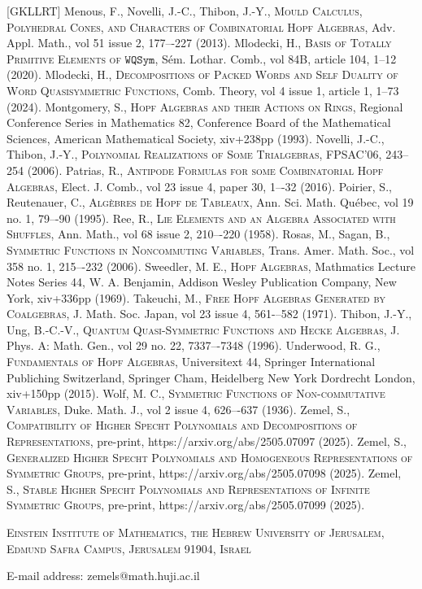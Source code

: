 \documentclass{article}
\theoremstyle{definition}
\begin{document}
\begin{thebibliography}{[GKLLRT]}
\bibitem[MNT]{[MNT]} Menous, F., Novelli, J.-C., Thibon, J.-Y., \textsc{Mould Calculus, Polyhedral Cones, and Characters of Combinatorial Hopf Algebras}, Adv. Appl. Math., vol 51 issue 2, 177–-227 (2013).
\bibitem[Ml1]{[Ml1]} Mlodecki, H., \textsc{Basis of Totally Primitive Elements of $\mathtt{WQSym}$}, S\'{e}m. Lothar. Comb., vol 84B, article 104, 1--12 (2020).
\bibitem[Ml2]{[Ml2]} Mlodecki, H., \textsc{Decompositions of Packed Words and Self Duality of Word Quasisymmetric Functions}, Comb. Theory, vol 4 issue 1, article 1, 1--73 (2024).
\bibitem[Mo]{[Mo]} Montgomery, S., \textsc{Hopf Algebras and their Actions on Rings}, Regional Conference Series in Mathematics 82, Conference Board of the Mathematical Sciences, American Mathematical Society, xiv+238pp (1993).
\bibitem[NT]{[NT]} Novelli, J.-C., Thibon, J.-Y., \textsc{Polynomial Realizations of Some Trialgebras}, FPSAC'06, 243--254 (2006).
\bibitem[P]{[P]} Patrias, R., \textsc{Antipode Formulas for some Combinatorial Hopf Algebras}, Elect. J. Comb., vol 23 issue 4, paper 30, 1–-32 (2016).
\bibitem[PR]{[PR]} Poirier, S., Reutenauer, C., \textsc{Alg\`{e}bres de Hopf de Tableaux}, Ann. Sci. Math. Qu\'{e}bec, vol 19 no. 1, 79–-90 (1995).
\bibitem[R]{[R]} Ree, R., \textsc{Lie Elements and an Algebra Associated with Shuffles}, Ann. Math., vol 68 issue 2, 210–-220 (1958).
\bibitem[RS]{[RS]} Rosas, M., Sagan, B., \textsc{Symmetric Functions in Noncommuting Variables}, Trans. Amer. Math. Soc., vol 358 no. 1, 215–-232 (2006).
\bibitem[S]{[S]} Sweedler, M. E., \textsc{Hopf Algebras}, Mathmatics Lecture Notes Series 44, W. A. Benjamin, Addison Wesley Publication Company, New York, xiv+336pp (1969).
\bibitem[T]{[T]} Takeuchi, M., \textsc{Free Hopf Algebras Generated by Coalgebras}, J. Math. Soc. Japan, vol 23 issue 4, 561-–582 (1971).
\bibitem[TU]{[TU]} Thibon, J.-Y., Ung, B.-C.-V., \textsc{Quantum Quasi-Symmetric Functions and Hecke Algebras}, J. Phys. A: Math. Gen., vol 29 no. 22, 7337–-7348 (1996).
\bibitem[U]{[U]} Underwood, R. G., \textsc{Fundamentals of Hopf Algebras}, Universitext 44, Springer International Publiching Switzerland, Springer Cham, Heidelberg New York Dordrecht London, xiv+150pp (2015).
\bibitem[W]{[W]} Wolf, M. C., \textsc{Symmetric Functions of Non-commutative Variables}, Duke. Math. J., vol 2 issue 4, 626–-637 (1936).
\bibitem[Z1]{[Z1]} Zemel, S., \textsc{Compatibility of Higher Specht Polynomials and Decompositions of Representations}, pre-print, https://arxiv.org/abs/2505.07097 (2025).
\bibitem[Z2]{[Z2]} Zemel, S., \textsc{Generalized Higher Specht Polynomials and Homogeneous Representations of Symmetric Groups}, pre-print, https://arxiv.org/abs/2505.07098 (2025).
\bibitem[Z3]{[Z3]} Zemel, S., \textsc{Stable Higher Specht Polynomials and Representations of Infinite Symmetric Groups}, pre-print, https://arxiv.org/abs/2505.07099 (2025).

\end{thebibliography}

\noindent\textsc{Einstein Institute of Mathematics, the Hebrew University of Jerusalem, Edmund Safra Campus, Jerusalem 91904, Israel}

\noindent E-mail address: zemels@math.huji.ac.il
\end{document}

